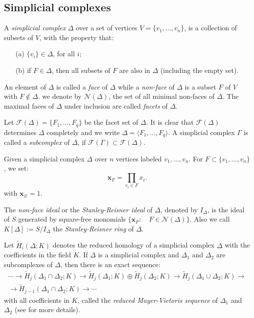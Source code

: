 \documentclass[a4paper,11pt]{amsart}
\theoremstyle{plain}
\theoremstyle{definition}
\theoremstyle{remark}
\begin{document}
\subsection*{Simplicial complexes}
A \textit{simplicial complex} $\Delta$ over a set of vertices $V=\{ v_{1}, \ldots, v_{n} \}$, is a collection of subsets of $V$, with the property that:
\begin{itemize}
\item[(a)] $\{ v_{i} \} \in \Delta $, for all $i$;
\item[(b)] if $F\in \Delta$, then all subsets of $F$ are also in $\Delta$ (including the empty set).
\end{itemize}
An element of $\Delta$ is called a \textit{face }of $\Delta$ while a \emph{non-face} of $\Delta$ is a subset $F$ of $V$ with $F \notin \Delta$. we denote by $\mathcal{N}(\Delta)$, the set of all minimal non-faces of $\Delta$. The maximal faces of $\Delta$ under inclusion are called \textit{facets} of $\Delta$.

Let $\mathcal{F}(\Delta) =\{F_{1}, \ldots, F_{q}\}$ be the facet set of $\Delta$. It is clear that $\mathcal{F}(\Delta)$ determines $\Delta$ completely and we write $\Delta = \langle F_{1}, \ldots, F_{q} \rangle$. A simplicial complex $\Gamma$ is called a \textit{subcomplex} of $\Delta$, if $\mathcal{F}(\Gamma) \subset \mathcal{F}(\Delta)$.

Given a simplicial complex $\Delta$ over $n$ vertices labeled $v_{1}, \ldots, v_{n}$. For $F \subset \{v_{1}, \ldots, v_{n} \}$, we set:
\begin{equation*}
\textbf{x}_F=\prod\limits_{v_i \in F}{x_i}.
\end{equation*}
with $\textbf{x}_\varnothing = 1$.

The \emph{non-face ideal} or the \emph{Stanley-Reisner ideal} of $\Delta$, denoted by $I_\Delta$, is the ideal of $S$ generated by square-free monomials $\{ \textbf{x}_F \colon \quad F \in \mathcal{N}(\Delta) \}$. Also we call $K[\Delta]:=S/I_\Delta$ the \emph{Stanley-Reisner ring} of $\Delta$.

Let $\tilde{H}_i \left( \Delta; K \right)$ denotes the reduced homology of a simplicial complex $\Delta$ with the coefficients in the field $K$. If $\Delta$ is a simplicial complex and $\Delta_1$ and $\Delta_2$ are subcomplexes of $\Delta$, then there is an exact sequence:
\begin{align} \label{Reduced Mayer-Vietoris sequence}
\cdots \to \tilde{H}_j(\Delta_1 \cap \Delta_2 ; K) \to \tilde{H}_j(\Delta_1; K) \oplus \tilde{H}_j(\Delta_2; K) \to  \tilde{H}_j(\Delta_1 \cup \Delta_2 ; K) \to \nonumber \\
\to  \tilde{H}_{j-1}(\Delta_1 \cap \Delta_2; K) \to \cdots
\end{align}
with all coefficients in $K$, called the \textit{reduced Mayer-Vietoris sequence} of $\Delta_1$ and $\Delta_2$ (see \cite[Proposition 5.1.8]{HerzogHibi} for more details).
\end{document}
